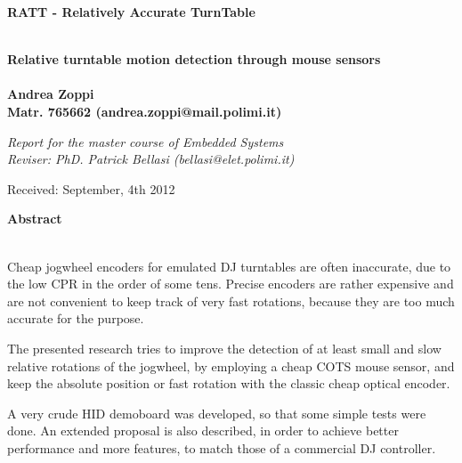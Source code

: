\documentclass[a4paper,10pt]{article}
\newenvironment*{mytitle}{\begin{LARGE}\bf}{\end{LARGE}\\}%
\newenvironment*{mysubtitle}{\bf}{\\[1.5ex]}%
\newenvironment*{myabstract}{\begin{Large}\bf}{\end{Large}\\[2.5ex]}%
\begin{document}
\newcommand{\ttDiscDiam}{12.00}
\newcommand{\ttNomAngSpeed}{33.00}
\newcommand{\ttPitchOff}{0.00}
\newcommand{\ttDiscPerim}{37.70}
\newcommand{\ttAngSpeed}{33.00}
\newcommand{\ttRevRate}{0.550}
\newcommand{\ttRevTime}{1.818}
\newcommand{\ttTgSpeed}{20.73}
		
\newcommand{\ssRes}{2000}
\newcommand{\ssMaxSpeed}{30}
\newcommand{\ssMaxDotRate}{60000}
\newcommand{\ssMaxDotsOneMs}{60}
		
\newcommand{\mmRadius}{4.00}
\newcommand{\mmAngleOff}{0.00}
\newcommand{\mmRadiusCm}{10.16}
\newcommand{\mmPerim}{25.13}
\newcommand{\mmSpeed}{13.82}
\newcommand{\mmDotRate}{27646}
\newcommand{\mmRevDots}{50265}



\begin{mytitle}RATT	- Relatively Accurate TurnTable\end{mytitle}
\begin{mysubtitle}Relative turntable motion detection through mouse sensors\end{mysubtitle}
\\
Andrea Zoppi\\
Matr. 765662 (andrea.zoppi@mail.polimi.it)\\
\begin{flushright}
\emph{Report for the master course of Embedded Systems}\\
\emph{Reviser: PhD. Patrick Bellasi (bellasi@elet.polimi.it)}
\end{flushright}

Received: September, 4th 2012\\
\hspace{10ex}

\begin{myabstract} Abstract \end{myabstract}
Cheap jogwheel encoders for emulated DJ turntables are often inaccurate, due
to the low CPR in the order of some tens. Precise encoders are rather expensive
and are not convenient to keep track of very fast rotations, because they
are too much accurate for the purpose.

The presented research tries to improve the detection of at least small and
slow relative rotations of the jogwheel, by employing a cheap COTS mouse sensor,
and keep the absolute position or fast rotation with the classic cheap optical
encoder.

A very crude HID demoboard was developed, so that some simple tests were done.
An extended proposal is also described, in order to achieve better performance
and more features, to match those of a commercial DJ controller.
\end{document}
